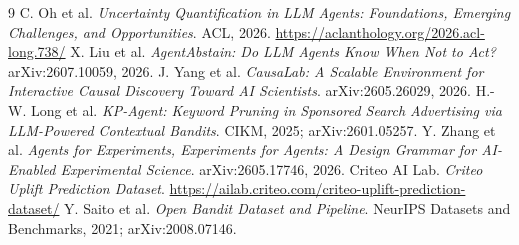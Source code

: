 \documentclass[11pt,twocolumn]{article}
\begin{document}
\begin{thebibliography}{9}\small
{} C. Oh et al. \emph{Uncertainty Quantification in LLM Agents: Foundations, Emerging Challenges, and Opportunities}. ACL, 2026. \url{https://aclanthology.org/2026.acl-long.738/}
 X. Liu et al. \emph{AgentAbstain: Do LLM Agents Know When Not to Act?} arXiv:2607.10059, 2026.
 J. Yang et al. \emph{CausaLab: A Scalable Environment for Interactive Causal Discovery Toward AI Scientists}. arXiv:2605.26029, 2026.
 H.-W. Long et al. \emph{KP-Agent: Keyword Pruning in Sponsored Search Advertising via LLM-Powered Contextual Bandits}. CIKM, 2025; arXiv:2601.05257.
 Y. Zhang et al. \emph{Agents for Experiments, Experiments for Agents: A Design Grammar for AI-Enabled Experimental Science}. arXiv:2605.17746, 2026.
 Criteo AI Lab. \emph{Criteo Uplift Prediction Dataset}. \url{https://ailab.criteo.com/criteo-uplift-prediction-dataset/}
 Y. Saito et al. \emph{Open Bandit Dataset and Pipeline}. NeurIPS Datasets and Benchmarks, 2021; arXiv:2008.07146.
\end{thebibliography}
\end{document}
